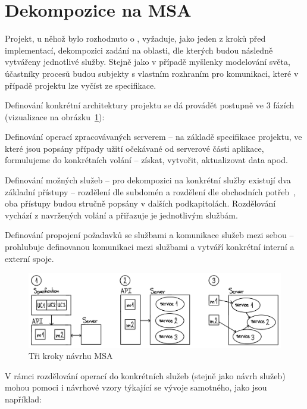 \section{Dekompozice na MSA}\label{sec:msa-decomposition}

Projekt, u něhož bylo rozhodnuto o , vyžaduje, jako jeden z kroků před implementací, dekompozici zadání na oblasti, dle kterých budou následně vytvářeny jednotlivé služby.
Stejně jako v případě myšlenky modelování světa, účastníky procesů budou subjekty s vlastním rozhraním pro komunikaci, které v případě projektu lze vyčíst ze specifikace.

Definování konkrétní architektury projektu se dá provádět postupně ve 3 fázích~\cite{msachris} (vizualizace na obrázku~\ref{fig:msa-decomposition-flow}):


\begin{ol}
   \item Definování operací zpracovávaných serverem – na základě specifikace projektu, ve které jsou popsány případy užití očekávané od serverové části aplikace, formulujeme do konkrétních volání – získat, vytvořit, aktualizovat data apod.
   \item Definování možných služeb – pro dekompozici na konkrétní služby existují dva základní přístupy – rozdělení dle subdomén a rozdělení dle obchodních potřeb~\cite{msachris}, oba přístupy budou stručně popsány v dalších podkapitolách.
   Rozdělování vychází z navržených volání a přiřazuje je jednotlivým službám.
   \item Definování propojení požadavků se službami a komunikace služeb mezi sebou – prohlubuje definovanou komunikaci mezi službami a vytváří konkrétní interní a externí spoje.
\end{ol}


\begin{figure}[htbp]
   \centering
   \includegraphics[max width=\textwidth]{assets/decomposition-flow}
   \caption{Tři kroky návrhu MSA}\label{fig:msa-decomposition-flow}
\end{figure}


V rámci rozdělování operací do konkrétních služeb (stejně jako návrh služeb) mohou pomoci i návrhové vzory týkající se vývoje samotného, jako jsou například:


